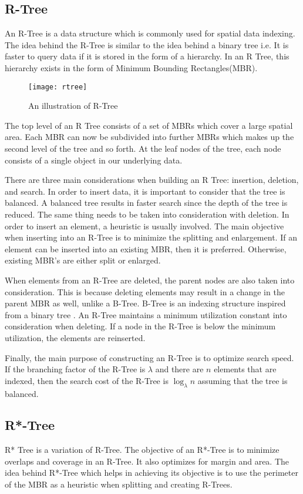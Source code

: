 \subsection{R-Tree}
An R-Tree is a data structure which is commonly used for spatial data indexing. The idea behind the R-Tree is similar to the idea behind a binary tree i.e. It is faster to query data if it is stored in the form of a hierarchy\citep{guttman1984r}. In an R Tree, this hierarchy exists in the form of Minimum Bounding Rectangles(MBR).

\begin{figure}[ht]
\texttt{[image: rtree]}
\caption{An illustration of R-Tree}
\label{fig:rtree}
\end{figure}

The top level of an R Tree consists of a set of MBRs which cover a large spatial area. Each MBR can now be subdivided into further MBRs which makes up the second level of the tree and so forth. At the leaf nodes of the tree, each node consists of a single object in our underlying data.

There are three main considerations when building an R Tree: insertion, deletion, and search. In order to insert data, it is important to consider that the tree is balanced. A balanced tree results in faster search since the depth of the tree is reduced. The same thing needs to be taken into consideration with deletion.
In order to insert an element, a heuristic is usually involved. The main objective when inserting into an R-Tree is to minimize the splitting and enlargement. If an element can be inserted into an existing MBR, then it is preferred. Otherwise, existing MBR's are either split or enlarged.

When elements from an R-Tree are deleted, the parent nodes are also taken into consideration. This is because deleting elements may result in a change in the parent MBR as well, unlike a B-Tree. B-Tree is an indexing structure inspired from a binary tree \citep{bayer1970organization}. An R-Tree maintains a minimum utilization constant into consideration when deleting. If a node in the R-Tree is below the minimum utilization, the elements are reinserted.

Finally, the main purpose of constructing an R-Tree is to optimize search speed. If the branching factor of the R-Tree is $\lambda$ and there are $n$ elements that are indexed, then the search cost of the R-Tree is $\log_{\lambda}{n}$ assuming that the tree is balanced.


\subsection{R*-Tree}
R* Tree is a variation of R-Tree\citep{beckmann1990r}. The objective of an R*-Tree is to minimize overlaps and coverage in an R-Tree. It also optimizes for margin and area. The idea behind R*-Tree which helps in achieving its objective is to use the perimeter of the MBR as a heuristic when splitting and creating R-Trees.


